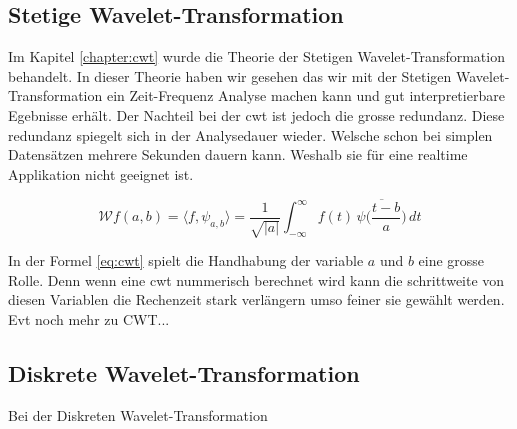 
\subsection{Stetige Wavelet-Transformation} 
Im Kapitel \ref{chapter:cwt} wurde die Theorie der Stetigen Wavelet-Transformation behandelt. In dieser Theorie haben wir gesehen das wir mit der Stetigen Wavelet-Transformation ein Zeit-Frequenz Analyse machen kann und gut interpretierbare Egebnisse erhält. Der Nachteil bei der cwt ist jedoch die grosse redundanz. Diese redundanz spiegelt sich in der Analysedauer wieder. Welsche schon bei simplen Datensätzen mehrere Sekunden dauern kann. Weshalb sie für eine realtime Applikation nicht geeignet ist. 

\begin{equation}
\mathcal{W}f (a,b)
=
\langle f,\psi_{a,b}\rangle
=
\frac{1}{\sqrt{|a|}}\int_{-\infty}^\infty f(t)\,\overline{
	\psi\biggl(\frac{t-b}{a}\biggr)}\,dt
\label{eq:cwt}
\end{equation}

In der Formel \ref{eq:cwt} spielt die Handhabung der variable $a$ und $b$ eine grosse Rolle. Denn wenn eine cwt nummerisch berechnet wird kann die schrittweite von diesen Variablen die Rechenzeit stark verlängern umso feiner sie gewählt werden.\\
Evt noch mehr zu CWT...

\subsection{Diskrete Wavelet-Transformation}
Bei der Diskreten Wavelet-Transformation 

